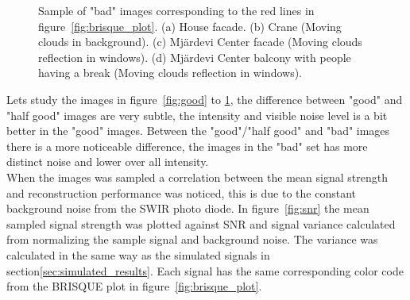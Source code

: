 \begin{figure}[H]
\begin{minipage}[t]{0.245\textwidth}
    \subcaption{}
    \label{fig:bad4}
\end{minipage}
    \caption{Sample of "bad" images corresponding to the red lines in figure~\ref{fig:brisque_plot}.
    (a)  House facade. (b) Crane (Moving clouds in background). (c) Mjärdevi Center facade (Moving clouds reflection in windows). (d) Mjärdevi Center balcony with people having a break (Moving clouds reflection in windows).}
    \label{fig:bad}
\end{figure}


Lets study the images in figure~\ref{fig:good} to \ref{fig:bad}, the difference between "good" and "half good" images are very subtle, the intensity and visible noise level is a bit better in the "good" images. Between the "good"/"half good" and "bad" images there is a more noticeable difference, the images in the "bad" set has more distinct noise and lower over all intensity.\\[0.1in]

When the images was sampled a correlation between the mean signal strength and reconstruction performance was noticed, this is due to the constant background noise from the SWIR photo diode. In figure~\ref{fig:snr} the mean sampled signal strength was plotted against SNR and signal variance calculated from normalizing the sample signal and background noise. The variance was calculated in the same way as the simulated signals in section\ref{sec:simulated_results}.  Each signal has the same corresponding color code from the BRISQUE plot in figure~\ref{fig:brisque_plot}.
 

